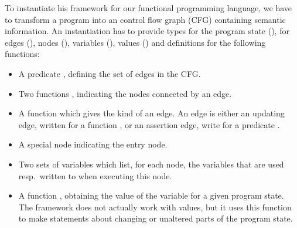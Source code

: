 \documentclass[a4paper,parskip=half,BCOR=8mm,DIV=calc,12pt]{scrbook}
\begin{document}
To instantiate his framework for our functional programming language, we have to transform a program into an control flow graph (CFG) containing semantic information. An instantiation has to provide types for the program state (), for edges (), nodes (), variables (), values () and definitions for the following functions:
\begin{itemize}
\item A predicate , defining the set of edges in the CFG. 
\item Two functions , indicating the nodes connected by an edge.
\item A function  which gives the kind of an edge. An edge is either an updating edge, written  for a function , or an assertion edge, write  for a predicate .
\item A special node  indicating the entry node.
\item Two sets of variables  which list, for each node, the variables that are used resp.\ written to when executing this node.
\item A function , obtaining the value of the variable for a given program state. The framework does not actually work with values, but it uses this function to make statements about changing or unaltered parts of the program state.
\end{itemize}
\end{document}
